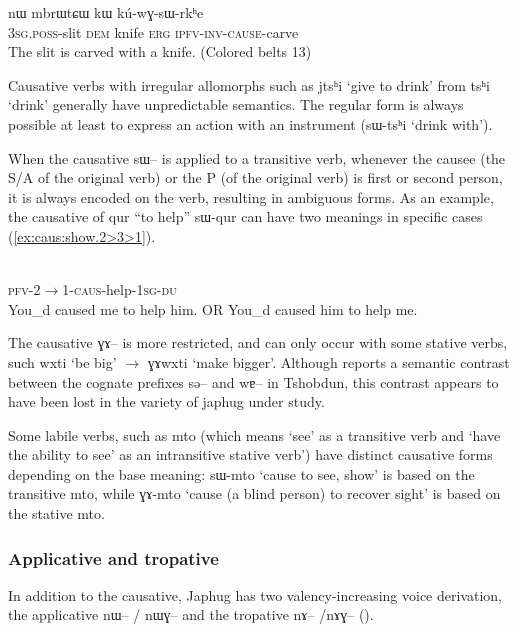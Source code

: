 \documentclass[oldfontcommands,oneside,a4paper,11pt]{article}
\newcommand{\ipa}[1]{{\phon#1}} %
\begin{document}
\begin{exe}
\ex \label{ex:caus.instrument}
\gll  \ipa{ɯ-χto} 	\ipa{nɯ} 	\ipa{mbrɯtɕɯ} 	\ipa{kɯ} 	\ipa{kú-wɣ-sɯ-rkʰe}  \\
\textsc{3sg.poss}-slit \textsc{dem} knife \textsc{erg}  \textsc{ipfv-inv-cause}-carve \\
 \glt  The slit is carved with a knife. (Colored belts 13)
\end{exe} 

Causative verbs with irregular allomorphs such as \ipa{jtsʰi} `give to drink'  from \ipa{tsʰi} `drink' generally have unpredictable semantics. The regular form is always possible at least to express an action with an instrument (\ipa{sɯ-tsʰi} `drink with').

When the causative \ipa{sɯ--} is applied to a transitive verb, whenever the causee (the S/A of the original verb) or the P (of the original verb) is first or second person, it is always encoded on the verb, resulting in ambiguous forms. As an example, the causative of \ipa{qur} ``to help''  \ipa{sɯ-qur} can have two meanings in specific cases (\ref{ex:caus:show.2>3>1}).

\begin{exe} 
\ex \label{ex:caus:show.2>3>1}
\gll   \ipa{tɤ-kɯ-sɯ-qur-a-ndʑi}  \\
 \textsc{pfv-2$\rightarrow$1-caus}-help-\textsc{1sg-du}  \\
 \glt  You_d caused me to help him. OR You_d caused him to help me. 
\end{exe} 

The causative \ipa{ɣɤ--} is more restricted, and can only occur with some stative verbs, such \ipa{wxti} `be big' $\rightarrow$ \ipa{ɣɤwxti} `make bigger'. Although \citet{jackson06paisheng, jackson14morpho} reports a semantic contrast between the cognate prefixes \ipa{sə}-- and \ipa{wɐ}-- in Tshobdun, this contrast appears to have been lost in the variety of japhug under study.

Some labile verbs, such as \ipa{mto} (which means `see' as a transitive verb and `have the ability to see' as an intransitive stative verb') have distinct causative forms depending on the base meaning: \ipa{sɯ-mto} `cause to see, show' is based on the transitive \ipa{mto}, while \ipa{ɣɤ-mto} `cause (a blind person) to recover sight' is based on the stative \ipa{mto}.


\subsubsection{Applicative and tropative}
In addition to the causative, Japhug has two valency-increasing voice derivation, the applicative \ipa{nɯ--} / \ipa{nɯɣ--} and the tropative \ipa{nɤ--} /\ipa{nɤɣ--} (\citealt{jacques13tropative}).
\end{document}
